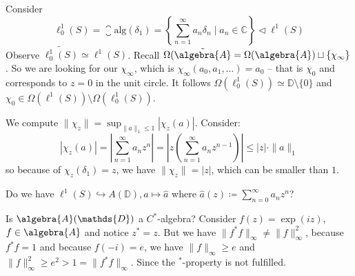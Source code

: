 \documentclass[a4paper]{article}
\begin{document}
\begin{example}[Norms $<1$]
	Consider 
	\begin{equation*}
		\ell^1_0(S) = \closure{\mathrm{alg}}(\delta_1) = \left\{ \sum_{n = 1}^{\infty} a_n \delta_n \mid a_n \in \mathds{C} \right\} \triangleleft \ell^1(S)
	\end{equation*}
	Observe $\widetilde{\ell^1_0(S)} \simeq \ell^1(S)$. Recall $\Omega(\tilde{\algebra{A}} = \Omega(\algebra{A}) \sqcup \{\chi_\infty\}$.
	So we are looking for our $\chi_\infty$, which is $\chi_\infty(a_0, a_1, \dots) = a_0$ -- that is $\chi_0$ and corresponds to $z=0$ in the unit circle.
	It follows $\Omega(\ell^1_0(S)) \simeq \mathds{D} \setminus \{ 0 \}$ and $\chi_0 \in \Omega(\ell^1(S)) \setminus \Omega(\ell^1_0(S))$. 

	We compute $\| \chi_z \| = \sup_{\|a\|_1 \leq 1} |\chi_z(a)|$. Consider:
	\begin{equation*}
		|\chi_z(a)| = \left| \sum_{n = 1}^\infty a_n z^n \right| = \left| z \left(\sum_{n=1}^{\infty} a_n z^{n-1} \right) \right| \leq |z| \cdot \| a \|_1
	\end{equation*}
	so because of $\chi_z(\delta_1) = z$, we have $\|\chi_z\| = |z|$, which can be smaller than $1$.
\end{example}

\begin{remark}
	Do we have $\ell^1(S) \hookrightarrow A(\mathds{D}), a \mapsto \hat{a}$ where $\hat{a}(z) \coloneq \sum_{n = 0}^\infty a_n z^n$?
\end{remark}

\begin{exercise}[02-03]
	Is $\algebra{A}(\mathds{D})$ a $C^*$-algebra?
	Consider $f(z) = \exp(iz)$, $f \in \algebra{A}$ and notice $z^* = z$.
	But we have $\|f^* f \|_\infty \neq \|f\|_\infty^2$, because $f^* f = 1$ and because $f(-i) = e$, we have $\|f\|_\infty \geq e$ and $\|f\|_\infty^2 \geq e^2 > 1 = \|f^* f\|_\infty$.
	Since the $^*$-property is not fulfilled.
\end{exercise}
\end{document}
